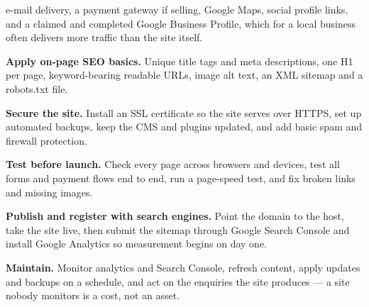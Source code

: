 \begin{qlist}
\begin{apts}
      e-mail delivery, a payment gateway if selling, Google Maps, social
      profile links, and a claimed and completed Google Business Profile, which
      for a local business often delivers more traffic than the site itself.
\item \textbf{Apply on-page SEO basics.} Unique title tags and meta
      descriptions, one H1 per page, keyword-bearing readable URLs, image alt
      text, an XML sitemap and a robots.txt file.
\item \textbf{Secure the site.} Install an SSL certificate so the site serves
      over HTTPS, set up automated backups, keep the CMS and plugins updated,
      and add basic spam and firewall protection.
\item \textbf{Test before launch.} Check every page across browsers and
      devices, test all forms and payment flows end to end, run a page-speed
      test, and fix broken links and missing images.
\item \textbf{Publish and register with search engines.} Point the domain to
      the host, take the site live, then submit the sitemap through Google
      Search Console and install Google Analytics so measurement begins on day
      one.
\item \textbf{Maintain.} Monitor analytics and Search Console, refresh content,
      apply updates and backups on a schedule, and act on the enquiries the
      site produces --- a site nobody monitors is a cost, not an asset.
\end{apts}


\end{qlist}
